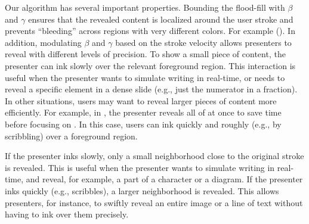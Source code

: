 Our algorithm has several important properties. Bounding the flood-fill with $\beta$ and $\gamma$ ensures that the revealed content is localized around the user stroke and prevents ``bleeding'' across regions with very different colors. For example (). 
%
In addition, modulating $\beta$ and $\gamma$ based on the stroke velocity allows presenters to reveal with different levels of precision. 
%
To show a small piece of content, the presenter can ink slowly over the relevant foreground region. This interaction is useful when the presenter wants to simulate writing in real-time, or needs to reveal a specific element in a dense slide (e.g., just the numerator in a fraction). 
%
In other situations, users may want to reveal larger pieces of content more efficiently. For example, in , the presenter reveals all of  at once to save time before focusing on . In this case, users can ink quickly and roughly (e.g., by scribbling) over a foreground region.


If the presenter inks slowly, only a small neighborhood close to the original stroke is revealed. This is useful when the presenter wants to simulate writing in real-time, and reveal, for example, a part of a character or a diagram.
%
If the presenter inks quickly (e.g., scribbles), a larger neighborhood is revealed. This allows presenters, for instance, to swiftly reveal an entire image or a line of text without having to ink over them precisely.   
\fi

